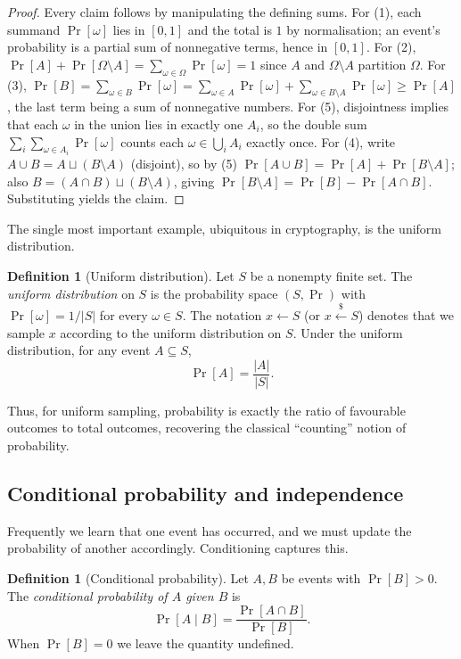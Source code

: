 \documentclass[11pt,a4paper]{article}
\theoremstyle{definition}
\newtheorem{definition}[theorem]{Definition}
\theoremstyle{remark}
\begin{document}
\begin{proof}
Every claim follows by manipulating the defining sums. For (1), each summand \(\Pr[\omega]\) lies in \([0,1]\) and the total is \(1\) by normalisation; an event's probability is a partial sum of nonnegative terms, hence in \([0,1]\). For (2), \(\Pr[A] + \Pr[\Omega \setminus A] = \sum_{\omega \in \Omega}\Pr[\omega] = 1\) since \(A\) and \(\Omega \setminus A\) partition \(\Omega\). For (3), \(\Pr[B] = \sum_{\omega \in B}\Pr[\omega] = \sum_{\omega \in A}\Pr[\omega] + \sum_{\omega \in B\setminus A}\Pr[\omega] \ge \Pr[A]\), the last term being a sum of nonnegative numbers. For (5), disjointness implies that each \(\omega\) in the union lies in exactly one \(A_i\), so the double sum \(\sum_i \sum_{\omega \in A_i}\Pr[\omega]\) counts each \(\omega \in \bigcup_i A_i\) exactly once. For (4), write \(A \cup B = A \sqcup (B \setminus A)\) (disjoint), so by (5) \(\Pr[A\cup B] = \Pr[A] + \Pr[B \setminus A]\); also \(B = (A\cap B) \sqcup (B \setminus A)\), giving \(\Pr[B \setminus A] = \Pr[B] - \Pr[A \cap B]\). Substituting yields the claim.
\end{proof}

The single most important example, ubiquitous in cryptography, is the uniform distribution.

\begin{definition}[Uniform distribution]\label{probability:def-uniform}
Let \(S\) be a nonempty finite set. The \emph{uniform distribution} on \(S\) is the probability space \((S, \Pr)\) with \(\Pr[\omega] = 1/|S|\) for every \(\omega \in S\). The notation \(x \leftarrow S\) (or \(x \xleftarrow{\$} S\)) denotes that we sample \(x\) according to the uniform distribution on \(S\). Under the uniform distribution, for any event \(A \subseteq S\),
\[
\Pr[A] = \frac{|A|}{|S|}.
\]
\end{definition}

Thus, for uniform sampling, probability is exactly the ratio of favourable outcomes to total outcomes, recovering the classical ``counting'' notion of probability.

\subsection{Conditional probability and independence}

Frequently we learn that one event has occurred, and we must update the probability of another accordingly. Conditioning captures this.

\begin{definition}[Conditional probability]\label{probability:def-cond}
Let \(A, B\) be events with \(\Pr[B] > 0\). The \emph{conditional probability of \(A\) given \(B\)} is
\[
\Pr[A \mid B] = \frac{\Pr[A \cap B]}{\Pr[B]}.
\]
When \(\Pr[B] = 0\) we leave the quantity undefined.
\end{definition}
\end{document}
